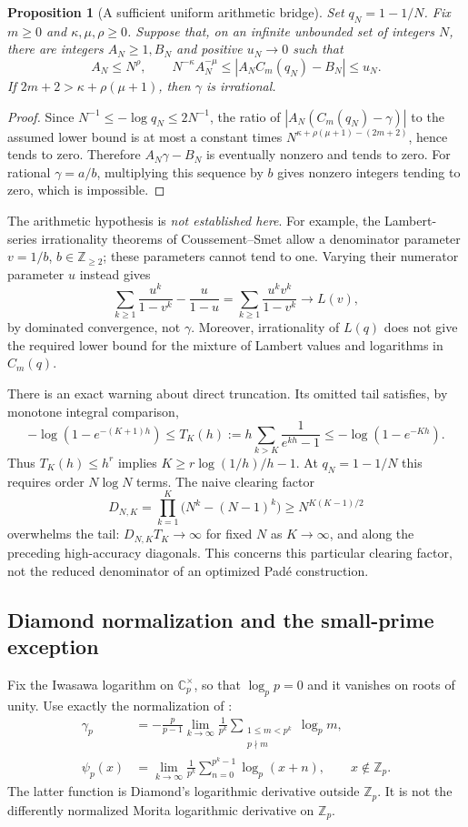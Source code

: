 \documentclass[11pt,a4paper]{article}
\newtheorem{proposition}[theorem]{Proposition}
\theoremstyle{definition}
\theoremstyle{remark}
\numberwithin{equation}{section}
\begin{document}
\begin{proposition}[A sufficient uniform arithmetic bridge]
\label{p5:conf:bridge}
Set $q_N=1-1/N$.  Fix $m\ge0$ and $\kappa,\mu,\rho\ge0$.
Suppose that, on an infinite unbounded set of integers $N$, there
are integers $A_N\ge1,B_N$ and positive $u_N\to0$ such that
\[
 A_N\le N^\rho,\qquad
 N^{-\kappa}A_N^{-\mu}
 \le |A_NC_m(q_N)-B_N|\le u_N.
\]
If $2m+2>\kappa+\rho(\mu+1)$, then $\gamma$ is irrational.
\end{proposition}
\begin{proof}
Since $N^{-1}\le-\log q_N\le2N^{-1}$, the ratio of
$|A_N(C_m(q_N)-\gamma)|$ to the assumed lower bound is at most a
constant times $N^{\kappa+\rho(\mu+1)-(2m+2)}$, hence tends to zero.
Therefore $A_N\gamma-B_N$ is eventually nonzero and tends to zero.
For rational $\gamma=a/b$, multiplying this sequence by $b$ gives
nonzero integers tending to zero, which is impossible.
\end{proof}

The arithmetic hypothesis is \emph{not established here}.
For example, the Lambert-series irrationality theorems of
Coussement--Smet \cite[Theorems 1.2--1.3]{p5:conf:CS} allow a denominator
parameter $v=1/b$, $b\in\mathbb Z_{\ge2}$; these parameters cannot
tend to one.  Varying their numerator parameter $u$ instead gives
\[
 \sum_{k\ge1}\frac{u^k}{1-v^k}-\frac{u}{1-u}
 =\sum_{k\ge1}\frac{u^kv^k}{1-v^k}\longrightarrow L(v),
\]
by dominated convergence, not $\gamma$.
Moreover, irrationality of $L(q)$ does not give the required lower
bound for the mixture of Lambert values and logarithms in $C_m(q)$.

There is an exact warning about direct truncation.  Its omitted tail
satisfies, by monotone integral comparison,
\[
 -\log(1-e^{-(K+1)h})\le
 T_K(h):=h\sum_{k>K}\frac1{e^{kh}-1}
 \le-\log(1-e^{-Kh}).
\]
Thus $T_K(h)\le h^r$ implies $K\ge r\log(1/h)/h-1$.
At $q_N=1-1/N$ this requires order $N\log N$ terms.  The naive
clearing factor
\[
 D_{N,K}=\prod_{k=1}^K\bigl(N^k-(N-1)^k\bigr)
 \ge N^{K(K-1)/2}
\]
overwhelms the tail: $D_{N,K}T_K\to\infty$ for fixed $N$ as
$K\to\infty$, and along the preceding high-accuracy diagonals.
This concerns this particular clearing factor, not the reduced
denominator of an optimized Pad\'e construction.

\subsection{Diamond normalization and the small-prime exception}
Fix the Iwasawa logarithm on $\mathbb C_p^\times$, so that
$\log_p p=0$ and it vanishes on roots of unity.  Use exactly the
normalization of \cite[p.~355]{p5:conf:MS}:
\begin{align*}
 \gamma_p&=-\frac p{p-1}\lim_{k\to\infty}
 \frac1{p^k}\sum_{\substack{1\le m<p^k\\p\nmid m}}\log_p m,\\
 \psi_p(x)&=\lim_{k\to\infty}\frac1{p^k}
 \sum_{n=0}^{p^k-1}\log_p(x+n),\qquad x\notin\mathbb Z_p.
\end{align*}
The latter function is Diamond's logarithmic derivative outside
$\mathbb Z_p$.  It is not the differently normalized Morita
logarithmic derivative on $\mathbb Z_p$.
\end{document}
